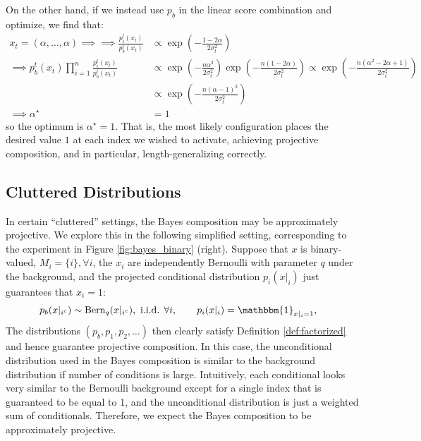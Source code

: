 On the other hand, if we instead use $p_b$ in the linear score combination and optimize, we find that:
\begin{align*}
    x_t = (\alpha, \ldots, \alpha) \implies
    \implies \frac{p_i^t(x_t)}{p_b^t(x_t)} &\propto \exp \left( -\frac{1-2\alpha}{2\sigma_t^2} \right) \\
    \implies p_b^t(x_t) \prod_{i=1}^n \frac{p_i^t(x_t)}{p_b^t(x_t)} &\propto \exp \left( -\frac{n\alpha^2}{2\sigma_t^2} \right) \exp \left( -\frac{n(1-2\alpha)}{2\sigma_t^2} \right) 
    \propto \exp \left( -\frac{n(\alpha^2-2\alpha+1)}{2\sigma_t^2} \right) \\
    &\propto \exp \left( -\frac{n(\alpha-1)^2}{2\sigma_t^2} \right) \\
    \implies \alpha^\star &= 1
\end{align*}
so the optimum is $\alpha^\star = 1$. That is, the most likely configuration places the desired value $1$ at each index we wished to activate, achieving projective composition, and in particular, length-generalizing correctly.

\subsection{Cluttered Distributions}
\label{app:clutter}
In certain ``cluttered'' settings, the Bayes composition may be approximately projective. We explore this in the following simplified setting, corresponding to the experiment in Figure \ref{fig:bayes_binary} (right). Suppose that $x$ is binary-valued, $M_i = \{i\}, \forall i$, the $x_i$ are independently Bernoulli with parameter $q$ under the background, and the projected conditional distribution $p_i(x|_i)$ just guarantees that $x_i = 1$: 
\begin{align}
    p_b(x |_{i^c}) &\sim \text{Bern}_q(x|_{i^c}), \text{ i.i.d. $\forall i$}, \quad \quad
    p_i(x |_{i}) = \mathbbm{1}_{x|_{i} = 1},
    \label{eq:binary_bernoulli}
\end{align}
The distributions $(p_b, p_1, p_2, \ldots)$ then clearly satisfy Definition \ref{def:factorized} and hence guarantee projective composition. In this case, the unconditional distribution used in the Bayes composition is similar to the background distribution if number of conditions is large. Intuitively, each conditional looks very similar to the Bernoulli background except for a single index that is guaranteed to be equal to 1, and the unconditional distribution is just a weighted sum of conditionals. Therefore, we expect the Bayes composition to be approximately projective.

